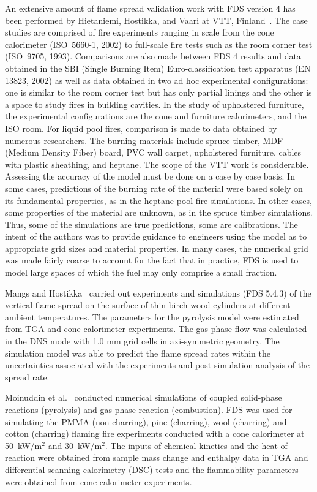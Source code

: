 An extensive amount of flame spread validation work with FDS version 4 has been performed  by  Hietaniemi,  Hostikka,  and  Vaari  at  VTT, Finland~\cite{Hietaniemi:1}. The case studies are comprised of fire experiments ranging in scale from the cone calorimeter (ISO~5660-1, 2002) to full-scale fire tests such as the room corner test (ISO~9705, 1993). Comparisons are also made between FDS 4 results and data obtained in the SBI (Single Burning Item) Euro-classification test apparatus (EN 13823, 2002) as well as data obtained in two ad hoc experimental configurations: one is similar to the room corner test but has only partial linings and the other is a space to study fires in building cavities. In the study of upholstered furniture, the experimental configurations are the cone and furniture calorimeters, and the ISO room. For liquid pool fires, comparison is made to data obtained by numerous researchers.  The burning materials include spruce timber, MDF (Medium Density Fiber) board, PVC wall carpet, upholstered furniture, cables with plastic sheathing, and heptane. The scope of the VTT work is considerable. Assessing the accuracy of the model must be done on a case by case basis. In some cases, predictions of the burning rate of the material were based solely on its fundamental properties, as in the heptane pool fire simulations. In other cases, some properties of the material are unknown, as in the spruce timber simulations. Thus, some of the simulations are true predictions, some are calibrations. The intent of the authors was to provide guidance to engineers using the model as to appropriate grid sizes and material properties. In many cases, the numerical grid was made fairly coarse to account for the fact that in practice, FDS is used to model large spaces of which the fuel may only comprise a small fraction.

Mangs and Hostikka~\cite{Mangs_Hostikka:IAFSS10} carried out experiments and simulations (FDS 5.4.3) of the vertical flame spread on the surface of thin birch wood cylinders at different ambient temperatures. The parameters for the pyrolysis model were estimated from TGA and cone calorimeter experiments. The gas phase flow was calculated in the DNS mode with 1.0 mm grid cells in axi-symmetric geometry. The simulation model was able to predict the flame spread rates within the uncertainties associated with the experiments and post-simulation analysis of the spread rate.

Moinuddin et al.~\cite{Moinuddin:Polymers2015} conducted numerical simulations of coupled solid-phase reactions (pyrolysis) and gas-phase reaction (combustion). FDS was used for simulating the PMMA (non-charring), pine (charring), wool (charring) and cotton (charring) flaming fire experiments conducted with a cone calorimeter at 50~kW/m$^2$ and 30~kW/m$^2$. The inputs of chemical kinetics and the heat of reaction were obtained from sample mass change and enthalpy data in TGA and differential scanning calorimetry (DSC) tests and the flammability parameters were obtained from cone calorimeter experiments.

